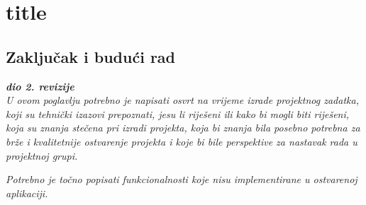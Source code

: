 \part{title}
\chapter{Zaključak i budući rad}
		
		\textbf{\textit{dio 2. revizije}}\\
		
		 \textit{U ovom poglavlju potrebno je napisati osvrt na vrijeme izrade projektnog zadatka, koji su tehnički izazovi prepoznati, jesu li riješeni ili kako bi mogli biti riješeni, koja su znanja stečena pri izradi projekta, koja bi znanja bila posebno potrebna za brže i kvalitetnije ostvarenje projekta i koje bi bile perspektive za nastavak rada u projektnoj grupi.}
		
		 \textit{Potrebno je točno popisati funkcionalnosti koje nisu implementirane u ostvarenoj aplikaciji.}
		
		\eject 